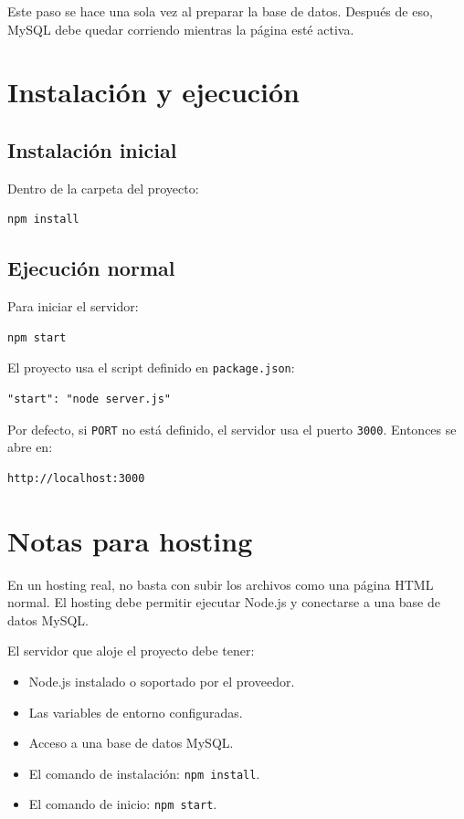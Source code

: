 \documentclass[12pt,letterpaper]{article}
\begin{document}
Este paso se hace una sola vez al preparar la base de datos. Después de eso, MySQL debe quedar corriendo mientras la página esté activa.

\section{Instalación y ejecución}

\subsection{Instalación inicial}

Dentro de la carpeta del proyecto:

\begin{lstlisting}[style=comandos]
npm install
\end{lstlisting}

\subsection{Ejecución normal}

Para iniciar el servidor:

\begin{lstlisting}[style=comandos]
npm start
\end{lstlisting}

El proyecto usa el script definido en \texttt{package.json}:

\begin{lstlisting}[style=comandos]
"start": "node server.js"
\end{lstlisting}

Por defecto, si \texttt{PORT} no está definido, el servidor usa el puerto \texttt{3000}. Entonces se abre en:

\begin{lstlisting}[style=comandos]
http://localhost:3000
\end{lstlisting}

\section{Notas para hosting}

En un hosting real, no basta con subir los archivos como una página HTML normal. El hosting debe permitir ejecutar Node.js y conectarse a una base de datos MySQL.

El servidor que aloje el proyecto debe tener:

\begin{itemize}
  \item Node.js instalado o soportado por el proveedor.
  \item Las variables de entorno configuradas.
  \item Acceso a una base de datos MySQL.
  \item El comando de instalación: \texttt{npm install}.
  \item El comando de inicio: \texttt{npm start}.
\end{itemize}
\end{document}
